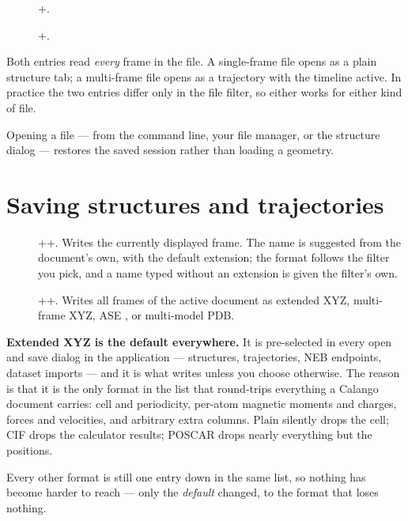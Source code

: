 \begin{description}
  \item[\menusep{}\menusep{}]
    +.
  \item[\menusep{}\menusep{}]
    +.
\end{description}

Both entries read \emph{every} frame in the file. A single-frame file opens
as a plain structure tab; a multi-frame file opens as a trajectory with the
timeline active. In practice the two entries differ only in the file
filter, so either works for either kind of file.

Opening a  file --- from the command line, your file
manager, or the structure dialog --- restores the saved session rather than
loading a geometry.

\section{Saving structures and trajectories}

\begin{description}
  \item[\menusep{}\menusep{}]
    ++. Writes the currently displayed frame.
    The name is suggested from the document's own, with the default
    extension; the format follows the filter you pick, and a name typed
    without an extension is given the filter's own.
  \item[\menusep{}\menusep{}]
    ++. Writes all frames of the active
    document as extended XYZ, multi-frame XYZ, ASE , or
    multi-model PDB.
\end{description}

\begin{calnote}
\textbf{Extended XYZ is the default everywhere.} It is pre-selected in every
open and save dialog in the application --- structures, trajectories, NEB
endpoints, dataset imports --- and it is what 
writes unless you choose otherwise. The reason is that it is the only format
in the list that round-trips everything a Calango document carries: cell and
periodicity, per-atom magnetic moments and charges, forces and velocities,
and arbitrary extra columns. Plain  silently drops the cell; CIF
drops the calculator results; POSCAR drops nearly everything but the
positions.

Every other format is still one entry down in the same list, so nothing has
become harder to reach --- only the \emph{default} changed, to the format
that loses nothing.
\end{calnote}


